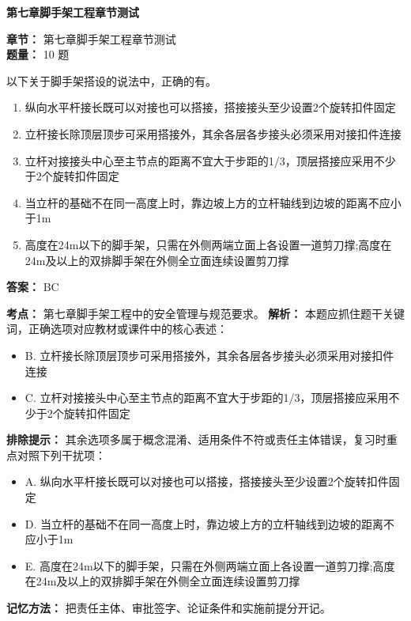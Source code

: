 \documentclass[UTF8,fontset=fandol,11pt]{ctexart}
\newcommand{\chaptertitle}[1]{\vspace{0.5em}\begin{tcolorbox}[enhanced,colback=deepblue,colframe=deepblue,arc=2mm,boxrule=0pt]\begin{center}\Large\bfseries\color{white}#1\end{center}\end{tcolorbox}\vspace{0.5em}}
\begin{document}
\chaptertitle{第七章脚手架工程章节测试}
\begin{mainbox}
\textbf{\textcolor{mainblue}{章节：}} 第七章脚手架工程章节测试\\
\textbf{\textcolor{answerred}{题量：}} 10 题
\end{mainbox}

\begin{quizbox}[title={第 1 题}]
以下关于脚手架搭设的说法中，正确的有。\\
\begin{enumerate}[label=\Alph*.]
\item 纵向水平杆接长既可以对接也可以搭接，搭接接头至少设置2个旋转扣件固定
\item 立杆接长除顶层顶步可采用搭接外，其余各层各步接头必须采用对接扣件连接
\item 立杆对接接头中心至主节点的距离不宜大于步距的1/3，顶层搭接应采用不少于2个旋转扣件固定
\item 当立杆的基础不在同一高度上时，靠边坡上方的立杆轴线到边坡的距离不应小于1m
\item 高度在24m以下的脚手架，只需在外侧两端立面上各设置一道剪刀撑;高度在24m及以上的双排脚手架在外侧全立面连续设置剪刀撑
\end{enumerate}
\textbf{答案：} BC
\vspace{0.25em}
\begin{answerbox}[title={考点解析}]
\textbf{考点：} 第七章脚手架工程中的安全管理与规范要求。
\textbf{解析：} 本题应抓住题干关键词，正确选项对应教材或课件中的核心表述：
\begin{itemize}
\item B. 立杆接长除顶层顶步可采用搭接外，其余各层各步接头必须采用对接扣件连接
\item C. 立杆对接接头中心至主节点的距离不宜大于步距的1/3，顶层搭接应采用不少于2个旋转扣件固定
\end{itemize}
\textbf{排除提示：} 其余选项多属于概念混淆、适用条件不符或责任主体错误，复习时重点对照下列干扰项：
\begin{itemize}
\item A. 纵向水平杆接长既可以对接也可以搭接，搭接接头至少设置2个旋转扣件固定
\item D. 当立杆的基础不在同一高度上时，靠边坡上方的立杆轴线到边坡的距离不应小于1m
\item E. 高度在24m以下的脚手架，只需在外侧两端立面上各设置一道剪刀撑;高度在24m及以上的双排脚手架在外侧全立面连续设置剪刀撑
\end{itemize}
\textbf{记忆方法：} 把责任主体、审批签字、论证条件和实施前提分开记。
\end{answerbox}
\end{quizbox}
\end{document}
